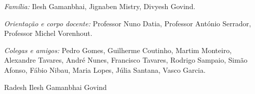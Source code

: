 {\begin{center}
\begin{minipage}{0.85\textwidth}
\centering
\textit{Família:} Ilesh Gamanbhai, Jignaben Mistry, Divyesh Govind.

\vspace{4pt}
\textit{Orientação e corpo docente:} Professor Nuno Datia, Professor António Serrador, Professor Michel Vorenhout.

\vspace{4pt}
\textit{Colegas e amigos:} Pedro Gomes, Guilherme Coutinho, Martim Monteiro, Alexandre Tavares, André Nunes, Francisco Tavares, Rodrigo Sampaio, Simão Afonso, Fábio Nibau, Maria Lopes, Júlia Santana, Vasco Garcia.
\end{minipage}
\end{center}

\nopagebreak[4]
\vspace{0.4cm}
\begin{flushright}
Radesh Ilesh Gamanbhai Govind
\end{flushright}

}
